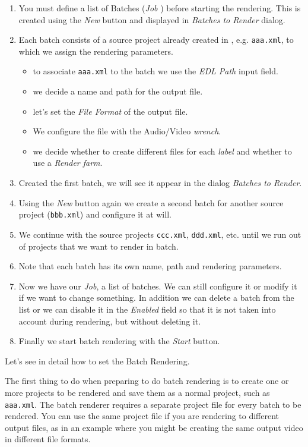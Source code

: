 \begin{enumerate}
	\item  You must define a list of Batches (\textit{Job} ) before starting the rendering. This is created using the \textit{New} button and displayed in \textit{Batches to Render} dialog.
	\item Each batch consists of a source project already created in \CGG{}, e.g. \texttt{aaa.xml}, to which we assign the rendering parameters.
	\begin{itemize}
		\item to associate \texttt{aaa.xml} to the batch we use the \textit{EDL Path} input field.
		\item we decide a name and path for the output file.
		\item let's set the \textit{File Format} of the output file.
		\item We configure the file with the Audio/Video \textit{wrench}.
		\item we decide whether to create different files for each \textit{label} and whether to use a \textit{Render farm}.
	\end{itemize}
	\item Created the first batch, we will see it appear in the dialog \textit{Batches to Render}.
	\item Using the \textit{New} button again we create a second batch for another source project (\texttt{bbb.xml}) and configure it at will.
	\item We continue with the source projects \texttt{ccc.xml}, \texttt{ddd.xml}, etc. until we run out of projects that we want to render in batch.
	\item Note that each batch has its own name, path and rendering parameters.
	\item Now we have our \textit{Job}, a list of batches. We can still configure it or modify it if we want to change something. In addition we can delete a batch from the list or we can disable it in the \textit{Enabled} field so that it is not taken into account during rendering, but without deleting it.
	\item Finally we start batch rendering with the \textit{Start} button.
\end{enumerate}

Let's see in detail how to set the Batch Rendering.

The first thing to do when preparing to do batch rendering is to
create one or more \CGG{} projects to be rendered and save them as a
normal project, such as \texttt{aaa.xml}.  The batch renderer
requires a separate project file for every batch to be rendered.
You can use the same \CGG{} project file if you are rendering to
different output files, as in an example where you might be creating
the same output video in different file formats.

